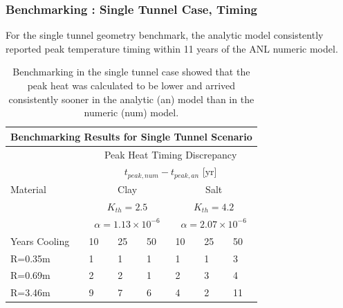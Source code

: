 \begin{frame}
  \frametitle{Benchmarking : Single Tunnel Case, Timing}
For the single tunnel geometry benchmark, the analytic model
consistently reported peak temperature timing within 11 years of the ANL 
numeric model. 
\footnotesize{
\begin{table}
  \begin{centering}
  \begin{tabular}{|l|l|l|l|l|l|l|}
    \multicolumn{7}{c}{\textbf{Benchmarking Results for Single Tunnel 
    Scenario}}\\
    \hline
    & \multicolumn{6}{|c|}{Peak Heat Timing Discrepancy}\\ 
    & \multicolumn{6}{|c|}{ $t_{peak,num}-t_{peak,an}$ [yr]} \\
    \hline
    Material & \multicolumn{3}{|c|}{Clay} & \multicolumn{3}{|c|}{Salt}\\ & 
    \multicolumn{3}{|c|}{$K_{th}=2.5$} & \multicolumn{3}{|c|}{$K_{th}=4.2$}\\ & 
    \multicolumn{3}{|c|}{$\alpha=1.13\times10^{-6}$} & 
    \multicolumn{3}{|c|}{$\alpha=2.07\times10^{-6}$}\\ \hline
    Years Cooling  & 10     & 25      & 50      & 10     & 25     & 50\\
    \hline
     R=0.35m  & 1    & 1       & 1   & 1      & 1      & 3\\
     R=0.69m  & 2    & 2       & 1    & 2      & 3      & 4\\
     R=3.46m  & 9    & 7       & 6    & 4      & 2      & 11\\
    \hline
  \end{tabular}
  \caption{Benchmarking in the single tunnel case showed that the peak heat was 
  calculated to be lower and arrived consistently sooner in the analytic (an) 
  model than in the numeric (num) model.  }
  \label{tab:benchSingle}
\end{centering}
\end{table}
}
\end{frame}

